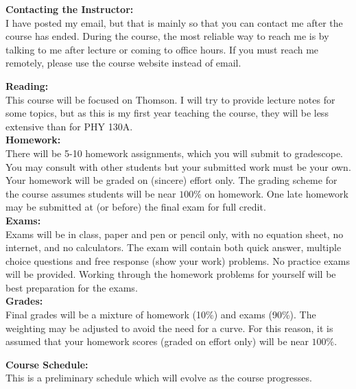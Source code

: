 \documentclass[12pt]{article}
\begin{document}
\noindent
\textbf {Contacting the Instructor:}\\
I have posted my email, but that is mainly so that you can contact me
after the course has ended.  During the course, the most reliable way
to reach me is by talking to me after lecture or coming to office
hours.  If you must reach me remotely, please use the course website
instead of email.

\newpage

\noindent
\textbf{Reading:}\\ This course will be focused on Thomson.  I will
try to provide lecture notes for some topics, but as this is my first
year teaching the course, they will be less extensive than for PHY
130A.\\[3pt]

\noindent
\textbf{Homework:}\\ There will be 5-10 homework assignments, which
you will submit to gradescope.  You may consult with other students
but your submitted work must be your own.  Your homework will be
graded on (sincere) effort only.  The grading scheme for the course
assumes students will be near $100\%$ on homework.  One late homework
may be submitted at (or before) the final exam for full credit.\\[3pt]

\noindent
\textbf{Exams:}\\ Exams will be in class, paper and pen or pencil
only, with no equation sheet, no internet, and no calculators.  The
exam will contain both quick answer, multiple choice questions and 
free response (show your work) problems.  No practice exams will be
provided.  Working through the homework problems for yourself will be
best preparation for the exams.\\[3pt]

\noindent
\textbf {Grades:}\\ Final grades will be a mixture of homework (10\%)
and exams (90\%).  The weighting may be adjusted to avoid the need for
a curve.  For this reason, it is assumed that your homework scores
(graded on effort only) will be near $100\%$.\\

\newpage

\noindent
\textbf {Course Schedule:}\\ This is a preliminary schedule which will
evolve as the course progresses.\\[3pt]
\end{document}
